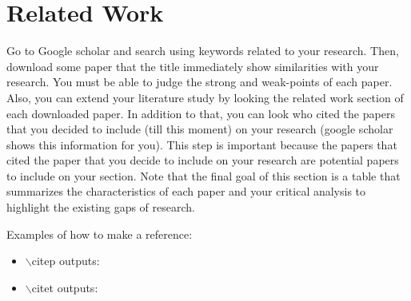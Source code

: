 \section{Related Work}

Go to Google scholar and search using keywords related to your research. Then,
download some paper that the title immediately show similarities with your
research. You must be able to judge the strong and weak-points of each paper.
Also, you can extend your literature study by looking the related work section
of each downloaded paper. In addition to that, you can look who cited the papers
that you decided to include (till this moment) on your research (google scholar
shows this information for you). This step is important because the papers that
cited the paper that you decide to include on your research are potential papers
to include on your section. Note that the final goal of this section is a table
that summarizes the characteristics of each paper and your critical analysis to
highlight the existing gaps of research.

Examples of how to make a reference:
\begin{itemize}
	\item $\backslash$citep outputs: \citep{jjsantanna2015IM1}
	\item $\backslash$citet outputs: \citet{jjsantanna2015IM1}
\end{itemize}

